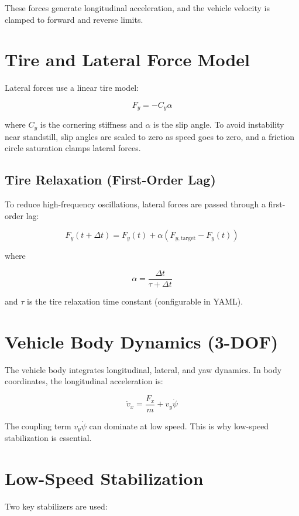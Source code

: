 \documentclass[11pt]{article}
\begin{document}
These forces generate longitudinal acceleration, and the vehicle velocity is clamped to forward and reverse limits.

\section{Tire and Lateral Force Model}
Lateral forces use a linear tire model:

\begin{equation}
F_y = -C_y \alpha
\end{equation}

where $C_y$ is the cornering stiffness and $\alpha$ is the slip angle. To avoid instability near standstill, slip angles are scaled to zero as speed goes to zero, and a friction circle saturation clamps lateral forces.

\subsection{Tire Relaxation (First-Order Lag)}
To reduce high-frequency oscillations, lateral forces are passed through a first-order lag:

\begin{equation}
F_{y}(t+\Delta t) = F_y(t) + \alpha (F_{y,\text{target}} - F_y(t))
\end{equation}

where

\begin{equation}
\alpha = \frac{\Delta t}{\tau + \Delta t}
\end{equation}

and $\tau$ is the tire relaxation time constant (configurable in YAML).

\section{Vehicle Body Dynamics (3-DOF)}
The vehicle body integrates longitudinal, lateral, and yaw dynamics. In body coordinates, the longitudinal acceleration is:

\begin{equation}
\dot{v}_x = \frac{F_x}{m} + v_y \dot{\psi}
\end{equation}

The coupling term $v_y\dot{\psi}$ can dominate at low speed. This is why low-speed stabilization is essential.

\section{Low-Speed Stabilization}
Two key stabilizers are used:
\end{document}
